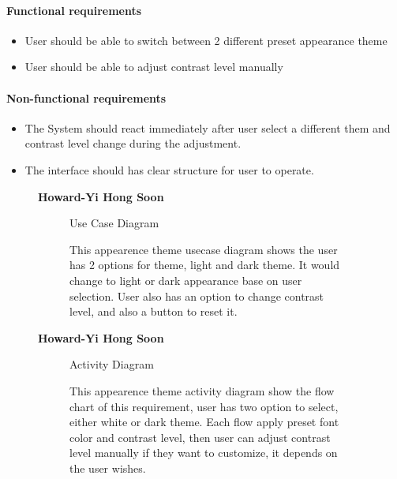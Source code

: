 \documentclass{article}
\begin{document}
		\paragraph{Functional requirements}
		\begin{itemize}
			\item User should be able to switch between 2 different preset appearance theme 
			\item User should be able to adjust contrast level manually
		\end{itemize}
		
		\paragraph{Non-functional requirements}
		\begin{itemize}
			\item The System should react immediately after user select a different them and contrast level change during the adjustment.
			\item The interface should has clear structure for user to operate.
		\end{itemize}

		\newpage
	

	\begin{figure}[htbp]
		\textbf{Howard-Yi Hong Soon}
		\centering
		\begin{subfigure}{\textwidth}
			\resizebox{\textwidth}{!}{}
			\caption{Use Case Diagram}
		\end{subfigure}
		\begin{subfigure}{\textwidth}
			This appearence theme usecase diagram shows the user has 2 options for theme, light and dark theme. It would
			change to light or dark appearance base on user selection. User also has an option to change contrast level, and also a button to reset it.
		\end{subfigure}
	\end{figure}

	\newpage
	

		\begin{figure}[htbp]
			\textbf{Howard-Yi Hong Soon}
			\centering
			\begin{subfigure}{\textwidth}
				\resizebox{\textwidth}{!}{}
				\caption{Activity Diagram}
			\end{subfigure}
			\begin{subfigure}{\textwidth}
				This appearence theme activity diagram show the flow chart of this requirement, user has two option to select, either white or dark theme.
				Each flow apply preset font color and contrast level, then user can adjust contrast level manually if they want to customize, it depends on the 
				user wishes.
			\end{subfigure}
		\end{figure}
		
\end{document}
